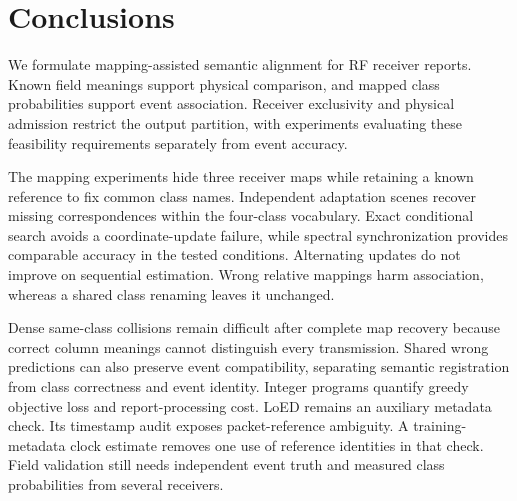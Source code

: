 \section{Conclusions}
We formulate mapping-assisted semantic alignment for RF receiver reports. Known field meanings support physical comparison, and mapped class probabilities support event association. Receiver exclusivity and physical admission restrict the output partition, with experiments evaluating these feasibility requirements separately from event accuracy.

The mapping experiments hide three receiver maps while retaining a known reference to fix common class names. Independent adaptation scenes recover missing correspondences within the four-class vocabulary. Exact conditional search avoids a coordinate-update failure, while spectral synchronization provides comparable accuracy in the tested conditions. Alternating updates do not improve on sequential estimation. Wrong relative mappings harm association, whereas a shared class renaming leaves it unchanged.

Dense same-class collisions remain difficult after complete map recovery because correct column meanings cannot distinguish every transmission. Shared wrong predictions can also preserve event compatibility, separating semantic registration from class correctness and event identity. Integer programs quantify greedy objective loss and report-processing cost. LoED remains an auxiliary metadata check. Its timestamp audit exposes packet-reference ambiguity. A training-metadata clock estimate removes one use of reference identities in that check. Field validation still needs independent event truth and measured class probabilities from several receivers.
